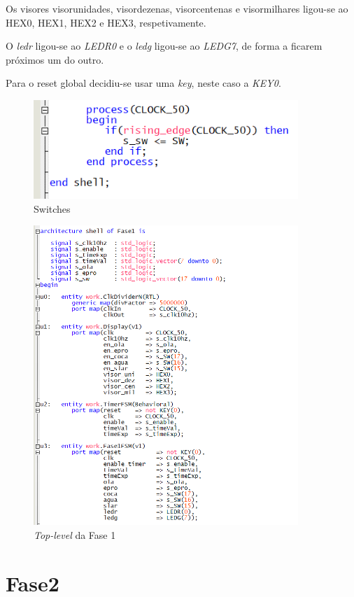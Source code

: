 \documentclass{report}
\begin{document}
Os visores visor\textunderscore unidades, visor\textunderscore dezenas, visor\textunderscore centenas e visor\textunderscore milhares ligou-se ao HEX0, HEX1, HEX2 e HEX3, respetivamente.

O \textit{ledr} ligou-se ao \textit{LEDR0} e o \textit{ledg} ligou-se ao \textit{LEDG7}, de forma a ficarem próximos um do outro. 

Para o reset global decidiu-se usar uma \textit{key}, neste caso a \textit{KEY0}.

\begin{figure}[H]
    \centering
    \includegraphics[width = 10cm]{Fase1TopLevelSWs.png}
    \caption{Switches}
    \label{fig:Switches}
\end{figure}

\begin{figure}[H]
    \centering
    \includegraphics[width = 10cm]{Fase1TopLevelSHELL.png}
    \caption{\textit{Top-level} da Fase 1}
    \label{fig:TLF1}
\end{figure}

\newpage

\section{Fase2}
\end{document}
